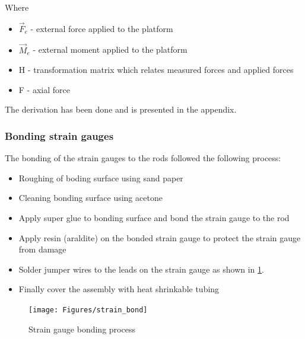 Where
\begin{itemize}
	\item $\vec{F}_e $ - external force applied to the platform
	\item $\vec{M}_e$ - external moment applied to the platform
	\item H - transformation matrix which relates measured forces and applied forces
	\item F - axial force
\end{itemize}
The derivation has been done and is presented in the appendix.

\subsubsection*{Bonding strain gauges}
The bonding of the strain gauges to the rods followed the following process:
\begin{itemize}
	\item Roughing of boding surface using sand paper
	\item Cleaning bonding surface using acetone
	\item Apply super glue to bonding surface and bond the strain gauge to the rod
	\item Apply resin (araldite) on the bonded strain gauge to protect the strain gauge from damage
	\item Solder jumper wires to the leads on the strain gauge as shown in \ref{fig:strain_bond}.
	\item Finally cover the assembly with heat shrinkable tubing
\end{itemize}
\begin{center}
	\begin{figure}[H]
		\centering
		\texttt{[image: Figures/strain\_bond]}
		\caption[Strain gauge bonding process]{Strain gauge bonding process}
		\label{fig:strain_bond}
	\end{figure}
\end{center}

